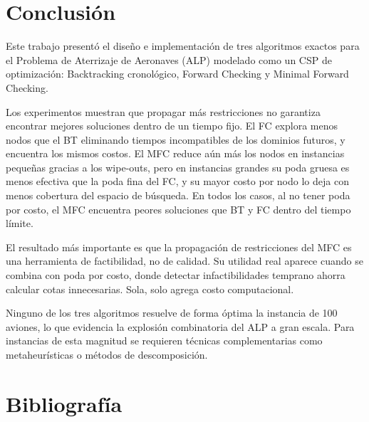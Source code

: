 \documentclass[12pt]{article}
\begin{document}
\section{Conclusión}

Este trabajo presentó el diseño e implementación de tres algoritmos exactos para el Problema de Aterrizaje de Aeronaves (ALP) modelado como un CSP de optimización: Backtracking cronológico, Forward Checking y Minimal Forward Checking.

Los experimentos muestran que propagar más restricciones no garantiza encontrar mejores soluciones dentro de un tiempo fijo. El FC explora menos nodos que el BT eliminando tiempos incompatibles de los dominios futuros, y encuentra los mismos costos. El MFC reduce aún más los nodos en instancias pequeñas gracias a los wipe-outs, pero en instancias grandes su poda gruesa es menos efectiva que la poda fina del FC, y su mayor costo por nodo lo deja con menos cobertura del espacio de búsqueda. En todos los casos, al no tener poda por costo, el MFC encuentra peores soluciones que BT y FC dentro del tiempo límite.

El resultado más importante es que la propagación de restricciones del MFC es una herramienta de factibilidad, no de calidad. Su utilidad real aparece cuando se combina con poda por costo, donde detectar infactibilidades temprano ahorra calcular cotas innecesarias. Sola, solo agrega costo computacional.

Ninguno de los tres algoritmos resuelve de forma óptima la instancia de 100 aviones, lo que evidencia la explosión combinatoria del ALP a gran escala. Para instancias de esta magnitud se requieren técnicas complementarias como metaheurísticas o métodos de descomposición.

\section{Bibliografía}
\end{document}
